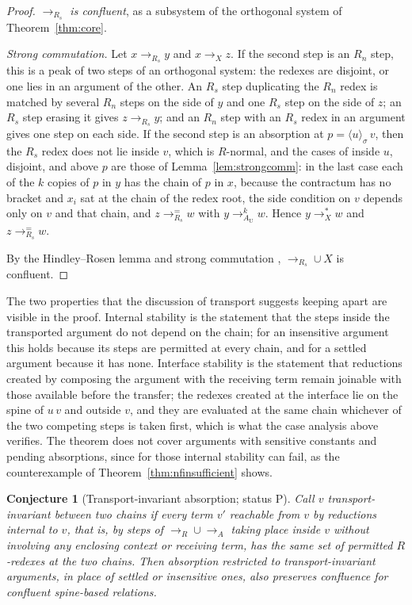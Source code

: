 \documentclass[11pt]{article}
\newtheorem{conjecture}[theorem]{Conjecture}
\theoremstyle{definition}
\theoremstyle{remark}
\newcommand{\br}[2]{\langle #1\rangle_{#2}}
\newcommand{\Pt}{status P}
\begin{document}
\begin{proof}
\emph{$\to_{R_s}$ is confluent}, as a subsystem of the orthogonal system of Theorem~\ref{thm:core}.

\emph{Strong commutation.} Let $x\to_{R_s}y$ and $x\to_X z$. If the second step is an $R_n$ step, this is a peak of two steps of an orthogonal system: the redexes are disjoint, or one lies in an argument of the other. An $R_s$ step duplicating the $R_n$ redex is matched by several $R_n$ steps on the side of $y$ and one $R_s$ step on the side of $z$; an $R_s$ step erasing it gives $z\to_{R_s}y$; and an $R_n$ step with an $R_s$ redex in an argument gives one step on each side. If the second step is an absorption at $p=\br u\sigma\,v$, then the $R_s$ redex does not lie inside $v$, which is $R$-normal, and the cases of inside $u$, disjoint, and above $p$ are those of Lemma~\ref{lem:strongcomm}: in the last case each of the $k$ copies of $p$ in $y$ has the chain of $p$ in $x$, because the contractum has no bracket and $x_i$ sat at the chain of the redex root, the side condition on $v$ depends only on $v$ and that chain, and $z\to_{R_s}^{=}w$ with $y\to_{A_{\mathrm U}}^{k}w$. Hence $y\to_X^{*}w$ and $z\to_{R_s}^{=}w$.

By the Hindley--Rosen lemma \citep[Ch.~1]{terese2003} and strong commutation \citep{huet1980}, $\to_{R_s}\cup X$ is confluent.
\end{proof}

The two properties that the discussion of transport suggests keeping apart are visible in the proof. Internal stability is the statement that the steps inside the transported argument do not depend on the chain; for an insensitive argument this holds because its steps are permitted at every chain, and for a settled argument because it has none. Interface stability is the statement that reductions created by composing the argument with the receiving term remain joinable with those available before the transfer; the redexes created at the interface lie on the spine of $u\,v$ and outside $v$, and they are evaluated at the same chain whichever of the two competing steps is taken first, which is what the case analysis above verifies. The theorem does not cover arguments with sensitive constants and pending absorptions, since for those internal stability can fail, as the counterexample of Theorem~\ref{thm:nfinsufficient} shows.

\begin{conjecture}[Transport-invariant absorption; \Pt]\label{conj:invariance}
Call $v$ \emph{transport-invariant} between two chains if every term $v'$ reachable from $v$ by reductions internal to $v$, that is, by steps of $\to_R\cup\to_A$ taking place inside $v$ without involving any enclosing context or receiving term, has the same set of permitted $R$-redexes at the two chains. Then absorption restricted to transport-invariant arguments, in place of settled or insensitive ones, also preserves confluence for confluent spine-based relations.
\end{conjecture}
\end{document}
